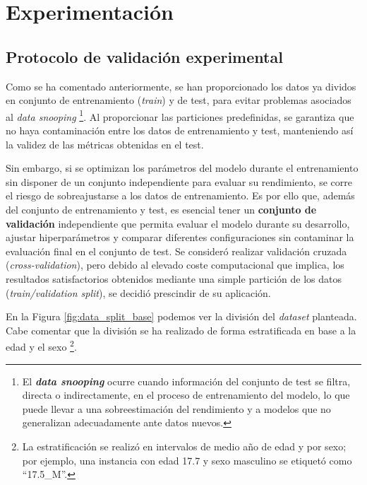 \chapter{Experimentación}


\section{Protocolo de validación experimental}

Como se ha comentado anteriormente, se han proporcionado los datos ya dividos en conjunto de entrenamiento (\textit{train}) y de test, para evitar problemas asociados al \textit{data snooping}%
\footnote{
    El \textbf{\textit{data snooping}} ocurre cuando información del conjunto de test se filtra, directa o indirectamente, en el proceso de entrenamiento del modelo, lo que puede llevar a una sobreestimación del rendimiento y a modelos que no generalizan adecuadamente ante datos nuevos.
}.
Al proporcionar las particiones predefinidas, se garantiza que no haya contaminación entre los datos de entrenamiento y test, manteniendo así la validez de las métricas obtenidas en el test. 

Sin embargo, si se optimizan los parámetros del modelo durante el entrenamiento sin disponer de un conjunto independiente para evaluar su rendimiento, se corre el riesgo de sobreajustarse a los datos de entrenamiento. Es por ello que, además del conjunto de entrenamiento y test, es esencial tener un \textbf{conjunto de validación} independiente que permita evaluar el modelo durante su desarrollo, ajustar hiperparámetros y comparar diferentes configuraciones sin contaminar la evaluación final en el conjunto de test. Se consideró realizar validación cruzada (\textit{cross-validation}), pero debido al elevado coste computacional que implica, los resultados satisfactorios obtenidos mediante una simple partición de los datos (\textit{train/validation split}), se decidió prescindir de su aplicación.

En la Figura \ref{fig:data_split_base} podemos ver la división del \textit{dataset} planteada. Cabe comentar que la división se ha realizado de forma estratificada en base a la edad y el sexo%
\footnote{
    La estratificación se realizó en intervalos de medio año de edad y por sexo; por ejemplo, una instancia con edad 17.7 y sexo masculino se etiquetó como ``17.5\_M''.
}.

